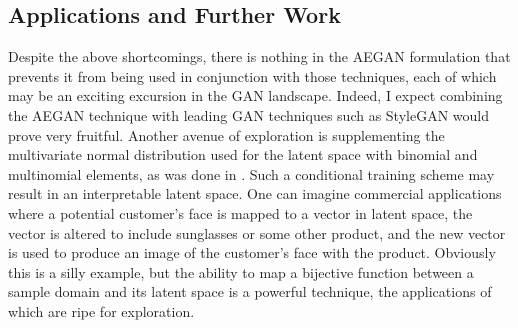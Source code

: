 \documentclass{article}
\begin{document}
\subsection{Applications and Further Work}
Despite the above shortcomings, there is nothing in the AEGAN formulation that prevents it from being used in conjunction with those techniques, each of which may be an exciting excursion in the GAN landscape. Indeed, I expect combining the AEGAN technique with leading GAN techniques such as StyleGAN would prove very fruitful. Another avenue of exploration is supplementing the multivariate normal distribution used for the latent space with binomial and multinomial elements, as was done in \cite{makhzani2015adversarial}. Such a conditional training scheme may result in an interpretable latent space. One can imagine commercial applications where a potential customer's face is mapped to a vector in latent space, the vector is altered to include sunglasses or some other product, and the new vector is used to produce an image of the customer's face with the product. Obviously this is a silly example, but the ability to map a bijective function between a sample domain and its latent space is a powerful technique, the applications of which are ripe for exploration.



  
  
\end{document}
